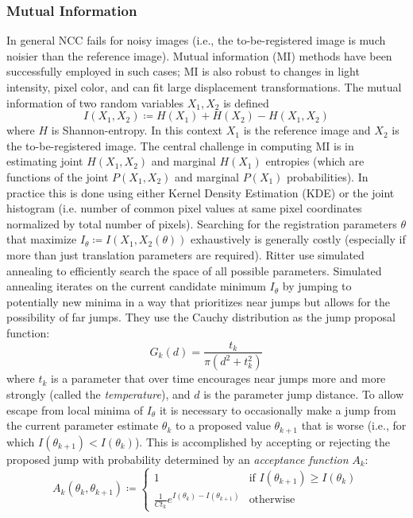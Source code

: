 \subsubsection{Mutual Information}

In general NCC fails for noisy images (i.e., the to-be-registered image is much noisier than the reference image).
%
Mutual information (MI) methods have been successfully employed in such cases; MI is also robust to changes in light intensity, pixel color, and can fit large displacement transformations.
%
The mutual information of two random variables \(X_1, X_2\) is defined
\[
	I (X_1,X_2) \coloneqq H (X_1)+H (X_2)-H (X_1,X_2)
\]
where \(H\) is Shannon-entropy.
%
In this context \(X_1\) is the reference image and \(X_2\) is the to-be-registered image.
%
The central challenge in computing MI is in estimating joint \(H(X_1,X_2)\) and marginal \(H(X_1)\) entropies (which are functions of the joint \(P(X_1,X_2)\) and marginal \(P(X_1)\) probabilities).
%
In practice this is done using either Kernel Density Estimation (KDE) or the joint histogram (i.e. number of common pixel values at same pixel coordinates normalized by total number of pixels).
%
Searching for the registration parameters \(\theta\) that maximize \(I_{\theta} \coloneqq I(X_1,X_2(\theta))\) exhaustively is generally costly (especially if more than just translation parameters are required).
%
Ritter \etal\cite{ritter1999} use simulated annealing to efficiently search the space of all possible parameters.
%
Simulated annealing iterates on the current candidate minimum \(I_{\theta}\) by jumping to potentially new minima in a way that prioritizes near jumps but allows for the possibility of far jumps.
%
They use the Cauchy distribution as the jump proposal function:
\[
	G_k(d) = \frac{t_k}{\pi \left( d^2 + t_k^2 \right)}
\]
where \(t_k\) is a parameter that over time encourages near jumps more and more strongly (called the \textit{temperature}), and \(d\) is the parameter jump distance.
%
To allow escape from local minima of \(I_{\theta}\) it is necessary to occasionally make a jump from the current parameter estimate \(\theta_k\) to a proposed value \(\theta_{k+1}\) that is worse (i.e., for which \(I(\theta_{k+1}) < I(\theta_{k}) \)).
%
This is accomplished by accepting or rejecting the proposed jump with probability determined by an \textit{acceptance function} \(A_k\):
\[
	A_k(\theta_{k}, \theta_{k+1}) \coloneqq \begin{cases}
		1                                                  & \text{if } I(\theta_{k+1}) \geq I(\theta_{k}) \\
		\frac{1}{C t_k}e^{I(\theta_{k}) - I(\theta_{k+1})} & \text{otherwise}
	\end{cases}
\]


